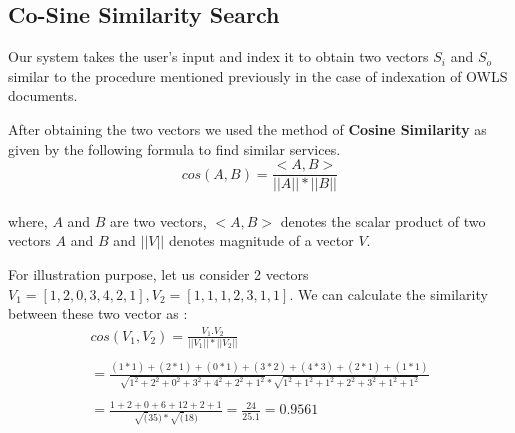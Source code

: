 \documentclass[12pt, oneside]{book}
\begin{document}
\subsection{Co-Sine Similarity Search}
Our system takes the user's input and index it to obtain two vectors $S_{i}$ and $S_{o}$ similar to the procedure mentioned previously in the case of indexation of OWLS documents. \\ \par
After obtaining the two vectors we used the method of \textbf{Cosine Similarity} as given by the following formula to find similar services.
\begin{equation}
  cos (A, B) = \frac{<A, B>}{|| A || * || B ||}
\end{equation}
\\
where, $A$ and $B$ are two vectors, $<A, B>$ denotes the scalar product of two vectors $A$ and $B$ and $||V||$ denotes magnitude of a vector $V$. \\ \par
For illustration purpose, let us consider 2 vectors $V_{1} = \left[ 1, 2, 0, 3, 4, 2, 1\right], V_{2} = \left[ 1, 1, 1, 2, 3, 1, 1\right]$. We can calculate the similarity between these two vector as : \\
\begin{multline}
 cos(V_{1}, V_{2}) = \frac{V_{1} . V_{2}}{||V_{1}||*||V_{2}||}  \\ \\ =  \frac{(1*1)+(2*1)+(0*1)+(3*2)+(4*3)+(2*1)+(1*1)}{\sqrt{1^{2} + 2^{2} + 0^{2} + 3^{2} + 4^{2} + 2^{2} + 1^{2}} * \sqrt{1^{2} + 1^{2} + 1^{2} + 2^{2} + 3^{2} + 1^{2} + 1^{2}}}  \\  \\=  \frac{1 + 2 + 0 + 6 + 12 + 2 + 1}{\sqrt(35)*\sqrt(18)} = \frac{24}{25.1} = 0.9561
\end{multline}
\end{document}
